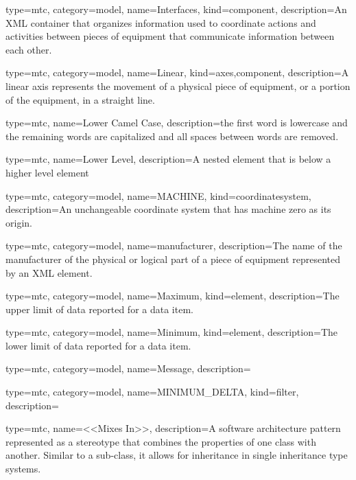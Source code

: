 {
  type=mtc,
  category=model,
  name={Interfaces},
  kind={component},
  description={An XML container that organizes information used to coordinate actions and activities between pieces of equipment that communicate information between each other. }
}


{
  type=mtc,
  category=model,
  name={Linear},
  kind={axes,component},
  description={A \gls{linear} axis represents the movement of a physical piece of equipment, or a portion of the equipment, in a straight line. }
}


{
  type=mtc,
  name={Lower Camel Case},
  description={the first word is lowercase and the remaining words are capitalized and all spaces between words are removed.}
}


{
  type=mtc,
  name={Lower Level},
  description={A nested element that is below a higher level element}
}


{
  type=mtc,
  category=model,
  name={MACHINE},
  kind={coordinatesystem},
  description={An unchangeable coordinate system that has machine zero as its origin.}
}


{
  type=mtc,
  category=model,
  name={manufacturer},
  description={The name of the manufacturer of the physical or logical part of a piece of equipment represented by an XML element.}
}


{
  type=mtc,
  category=model,
  name={Maximum},
  kind={element},
  description={The upper limit of data reported for a data item.}
}


{
  type=mtc,
  category=model,
  name={Minimum},
  kind={element},
  description={The lower limit of data reported for a data item.}
}


{
  type=mtc,
  category=model,
  name={Message},
  description={}
}


{
  type=mtc,
  category=model,
  name={MINIMUM\_DELTA},
  kind={filter},
  description={}
}


{
  type=mtc,
  name={<<Mixes In>>},
  description={A software architecture pattern represented as a \gls{stereotype} that combines the properties of one class with another. Similar to a sub-class, it allows for inheritance in single inheritance type systems.}
}


